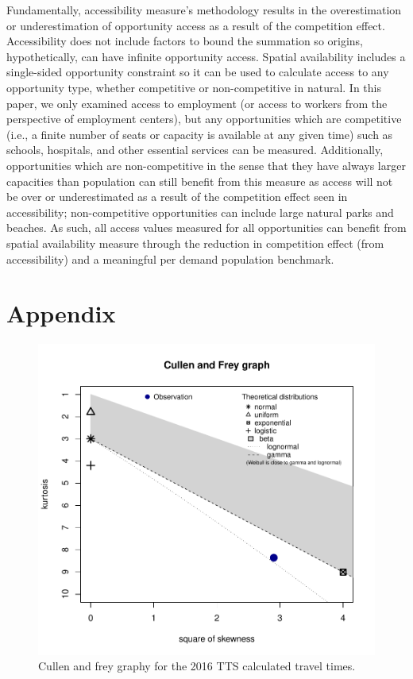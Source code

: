 \documentclass[]{elsarticle} %
\begin{document}
Fundamentally, accessibility measure's methodology results in the
overestimation or underestimation of opportunity access as a result of
the competition effect. Accessibility does not include factors to bound
the summation so origins, hypothetically, can have infinite opportunity
access. Spatial availability includes a single-sided opportunity
constraint so it can be used to calculate access to any opportunity
type, whether competitive or non-competitive in natural. In this paper,
we only examined access to employment (or access to workers from the
perspective of employment centers), but any opportunities which are
competitive (i.e., a finite number of seats or capacity is available at
any given time) such as schools, hospitals, and other essential services
can be measured. Additionally, opportunities which are non-competitive
in the sense that they have always larger capacities than population can
still benefit from this measure as access will not be over or
underestimated as a result of the competition effect seen in
accessibility; non-competitive opportunities can include large natural
parks and beaches. As such, all access values measured for all
opportunities can benefit from spatial availability measure through the
reduction in competition effect (from accessibility) and a meaningful
per demand population benchmark.

\newpage

\hypertarget{appendix}{%
\section{Appendix}\label{appendix}}

\begin{figure}
\includegraphics[width=1\linewidth]{Spatial-Availability_files/figure-latex/plot-cullen-frey-1} \caption{\label{fig:plot-cullen-frey}Cullen and frey graphy for the 2016 TTS calculated travel times.}\label{fig:plot-cullen-frey}
\end{figure}
\end{document}
